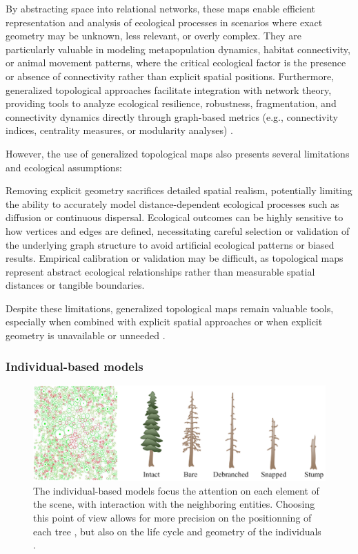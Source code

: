 By abstracting space into relational networks, these maps enable efficient representation and analysis of ecological processes in scenarios where exact geometry may be unknown, less relevant, or overly complex. They are particularly valuable in modeling metapopulation dynamics, habitat connectivity, or animal movement patterns, where the critical ecological factor is the presence or absence of connectivity rather than explicit spatial positions. Furthermore, generalized topological approaches facilitate integration with network theory, providing tools to analyze ecological resilience, robustness, fragmentation, and connectivity dynamics directly through graph-based metrics (e.g., connectivity indices, centrality measures, or modularity analyses) \cite{Lemiere2023,Gaucherel2012}.

However, the use of generalized topological maps also presents several limitations and ecological assumptions:
\begin{Itemize}
    \Item{} Removing explicit geometry sacrifices detailed spatial realism, potentially limiting the ability to accurately model distance-dependent ecological processes such as diffusion or continuous dispersal.
    \Item{} Ecological outcomes can be highly sensitive to how vertices and edges are defined, necessitating careful selection or validation of the underlying graph structure to avoid artificial ecological patterns or biased results.
    \Item{} Empirical calibration or validation may be difficult, as topological maps represent abstract ecological relationships rather than measurable spatial distances or tangible boundaries.
\end{Itemize}

Despite these limitations, generalized topological maps remain valuable tools, especially when combined with explicit spatial approaches \cite{Ecormier-Nocca2021} or when explicit geometry is unavailable or unneeded \cite{Duflot2018,Boussange2022}. 

\subsubsection{Individual-based models}

\begin{figure}[H]
    \centering
    \includegraphics[]{individual-based-modeling-teaser.png}
    \caption{The individual-based models focus the attention on each element of the scene, with interaction with the neighboring entities. Choosing this point of view allows for more precision on the positionning of each tree \cite{Alsweis2006}, but also on the life cycle and geometry of the individuals \cite{Peytavie2024a}. }
    \label{fig:env-obj-individual-based-models}    
\end{figure}

